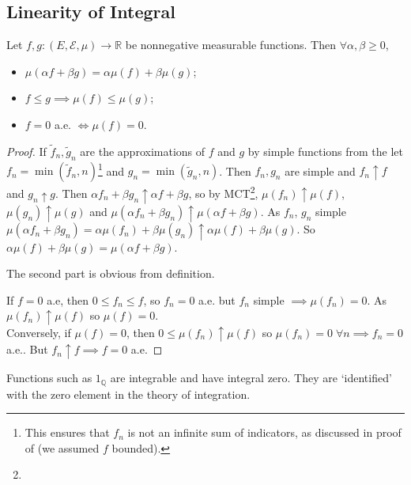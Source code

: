 \subsection{Linearity of Integral}
\begin{theorem}
	Let $f, g \colon (E, \mathcal E, \mu) \to \mathbb R$ be nonnegative measurable functions.
	Then $\forall \alpha, \beta \geq 0$,
	\begin{itemize}
		\item $\mu(\alpha f + \beta g) = \alpha \mu(f) + \beta \mu(g)$;
		\item $f \leq g \implies \mu(f) \leq \mu(g)$;
		\item $f = 0$ a.e. $\iff \mu(f) = 0$.
	\end{itemize}
\end{theorem}

\begin{proof}
	If $\widetilde f_n, \widetilde g_n$ are the approximations of $f$ and $g$ by simple functions from the  let $f_n = \min(\widetilde f_n, n)$\footnote{This ensures that $f_n$ is not an infinite sum of indicators, as discussed in proof of  (we assumed $f$ bounded).} and $g_n = \min(\widetilde g_n, n)$.
	Then $f_n, g_n$ are simple and $f_n \uparrow f$ and $g_n \uparrow g$.
	Then $\alpha f_n + \beta g_n \uparrow \alpha f + \beta g$, so by MCT\footnote{}, $\mu(f_n) \uparrow \mu(f)$, $\mu(g_n) \uparrow \mu(g)$ and $\mu(\alpha f_n + \beta g_n) \uparrow \mu(\alpha f + \beta g)$.
	As $f_n$, $g_n$ simple $\mu(\alpha f_n + \beta g_n) = \alpha \mu(f_n) + \beta \mu(g_n) \uparrow \alpha \mu(f) + \beta \mu(g)$.
	So $\alpha \mu(f) + \beta \mu(g) = \mu(\alpha f + \beta g)$.

	The second part is obvious from definition.

	If $f = 0$ a.e, then $0 \leq f_n \leq f$, so $f_n = 0$ a.e. but $f_n$ simple $\implies \mu(f_n) = 0$.
	As $\mu(f_n) \uparrow \mu(f)$ so $\mu(f) = 0$. \\
	Conversely, if $\mu(f) = 0$, then $0 \leq \mu(f_n) \uparrow \mu(f)$ so $\mu(f_n) = 0 \; \forall n \implies f_n = 0$ a.e..
	But $f_n \uparrow f \implies f = 0$ a.e.
\end{proof}

\begin{remark}
	Functions such as $1_{\mathbb Q}$ are integrable and have integral zero.
	They are `identified' with the zero element in the theory of integration.
\end{remark}

